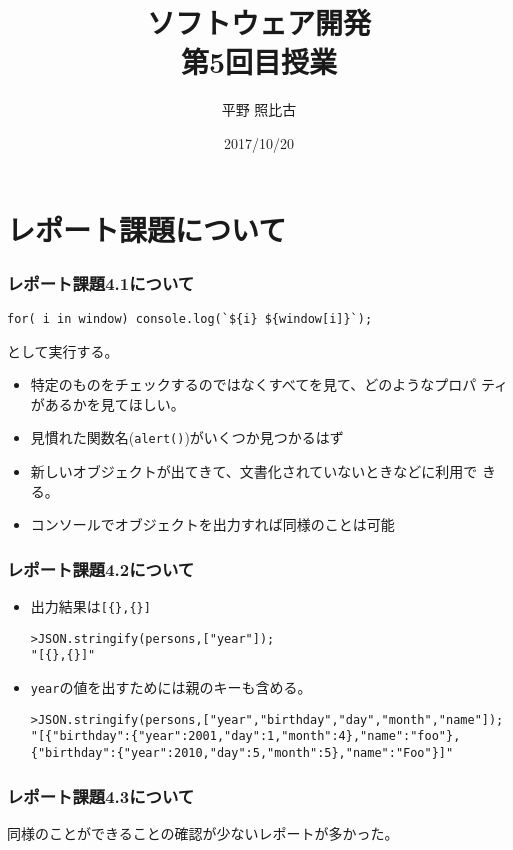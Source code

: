 %

\title{ソフトウェア開発\\第5回目授業}
\author{平野 照比古}
\institute{}
\date{2017/10/20}

\frame{\maketitle}
\section{レポート課題について}
\begin{frame}[containsverbatim]
 \frametitle{レポート課題4.1について}
\begin{Verbatim}
for( i in window) console.log(`${i} ${window[i]}`);
\end{Verbatim}
 として実行する。
 \begin{itemize}
  \item 特定のものをチェックするのではなくすべてを見て、どのようなプロパ
        ティがあるかを見てほしい。
  \item 見慣れた関数名(\Verb+alert()+)がいくつか見つかるはず
  \item 新しいオブジェクトが出てきて、文書化されていないときなどに利用で
        きる。
  \item コンソールでオブジェクトを出力すれば同様のことは可能
 \end{itemize}
\end{frame}
\begin{frame}[containsverbatim]
 \frametitle{レポート課題4.2について}
 \begin{itemize}
  \item      出力結果は\Verb+[{},{}]+
\begin{Verbatim}
>JSON.stringify(persons,["year"]);
"[{},{}]"
 \end{Verbatim}
  \item \texttt{year}の値を出すためには親のキーも含める。
        {\footnotesize
\begin{Verbatim}
>JSON.stringify(persons,["year","birthday","day","month","name"]);
"[{"birthday":{"year":2001,"day":1,"month":4},"name":"foo"},
{"birthday":{"year":2010,"day":5,"month":5},"name":"Foo"}]"
\end{Verbatim}
        }
 \end{itemize}
\end{frame}
\begin{frame}[containsverbatim]
 \frametitle{レポート課題4.3について}
 同様のことができることの確認が少ないレポートが多かった。
\end{frame}
